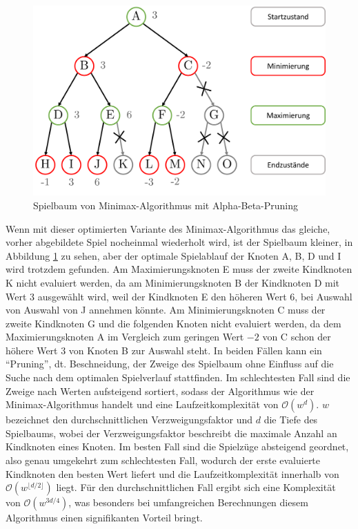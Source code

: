 \begin{figure}[!ht]
    \centering
    \includegraphics[width=\textwidth]{res/pictures/minimax-tree-with-a-b-pruning.pdf}
    \caption{Spielbaum von Minimax-Algorithmus mit Alpha-Beta-Pruning}
    \label{fig:minimax-a-b-tree}
\end{figure}

Wenn mit dieser optimierten Variante des Minimax-Algorithmus das gleiche, vorher abgebildete Spiel nocheinmal wiederholt wird, ist der Spielbaum kleiner, in Abbildung \ref{fig:minimax-a-b-tree} zu sehen, aber der optimale Spielablauf der Knoten A, B, D und I wird trotzdem gefunden. Am Maximierungsknoten E muss der zweite Kindknoten K nicht evaluiert werden, da am Minimierungsknoten B der Kindknoten D mit Wert 3 ausgewählt wird, weil der Kindknoten E den höheren Wert 6, bei Auswahl von Auswahl von J annehmen könnte. Am Minimierungsknoten C muss der zweite Kindknoten G und die folgenden Knoten nicht evaluiert werden, da dem Maximierungsknoten A im Vergleich zum geringen Wert $-2$ von C schon der höhere Wert 3 von Knoten B zur Auswahl steht. In beiden Fällen kann ein \enquote{Pruning}, dt. Beschneidung, der Zweige des Spielbaum ohne Einfluss auf die Suche nach dem optimalen Spielverlauf stattfinden. Im schlechtesten Fall sind die Zweige nach Werten aufsteigend sortiert, sodass der Algorithmus wie der Minimax-Algorithmus handelt und eine Laufzeitkomplexität von $\mathcal{O}(w^{d})$. $w$ bezeichnet den durchschnittlichen Verzweigungsfaktor und $d$ die Tiefe des Spielbaums, wobei der Verzweigungsfaktor beschreibt die maximale Anzahl an Kindknoten eines Knoten. Im besten Fall sind die Spielzüge absteigend geordnet, also genau umgekehrt zum schlechtesten Fall, wodurch der erste evaluierte Kindknoten den besten Wert liefert und die Laufzeitkomplexität innerhalb von $\mathcal{O}\left(w^{\lfloor d/2\rfloor}\right)$ liegt. Für den durchschnittlichen Fall ergibt sich eine Komplexität von $\mathcal{O}\left(w^{3d/4}\right)$, was besonders bei umfangreichen Berechnungen diesem Algorithmus einen signifikanten Vorteil bringt. \cite[S. 3 ff.]{2017.AlphaBeta}

